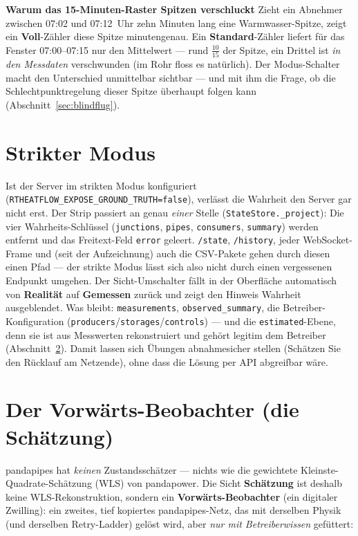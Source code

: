 \documentclass[11pt,a4paper,parskip=half]{scrreprt}
\newcommand{\ui}[1]{\textsf{\bfseries #1}}
\newcommand{\api}[1]{\texttt{#1}}
\newenvironment{beispiel}[1][Beispiel]
  {\par\medskip{\color{bsp}\hrule height 0.8pt}\nopagebreak\smallskip
   \noindent\textbf{\textsf{\textcolor{bsp}{#1}}}\quad\ignorespaces}
  {\par\nopagebreak\smallskip{\color{bsp}\hrule height 0.8pt}\par\medskip}
\begin{document}
\begin{beispiel}[Warum das 15-Minuten-Raster Spitzen verschluckt]
Zieht ein Abnehmer zwischen 07:02 und 07:12~Uhr zehn Minuten lang eine
Warmwasser-Spitze, zeigt ein \ui{Voll}-Zähler diese Spitze minutengenau. Ein
\ui{Standard}-Zähler liefert für das Fenster 07:00--07:15 nur den Mittelwert
--- rund $\tfrac{10}{15}$ der Spitze, ein Drittel ist \emph{in den Messdaten}
verschwunden (im Rohr floss es natürlich). Der Modus-Schalter macht den
Unterschied unmittelbar sichtbar --- und mit ihm die Frage, ob die
Schlechtpunktregelung dieser Spitze überhaupt folgen kann
(Abschnitt~\ref{sec:blindflug}).
\end{beispiel}

\section{Strikter Modus}
\label{sec:strikt}

Ist der Server im strikten Modus konfiguriert
(\api{RTHEATFLOW\_EXPOSE\_GROUND\_TRUTH=false}), verlässt die Wahrheit den
Server gar nicht erst. Der Strip passiert an genau \emph{einer} Stelle
(\texttt{StateStore.\_project}): Die vier Wahrheits-Schlüssel
(\texttt{junctions}, \texttt{pipes}, \texttt{consumers}, \texttt{summary})
werden entfernt und das Freitext-Feld \texttt{error} geleert. \api{/state},
\api{/history}, jeder WebSocket-Frame und (seit der Aufzeichnung) auch die
CSV-Pakete gehen durch diesen einen Pfad --- der strikte Modus lässt sich also
nicht durch einen vergessenen Endpunkt umgehen. Der Sicht-Umschalter fällt in
der Oberfläche automatisch von \ui{Realität} auf \ui{Gemessen} zurück und zeigt
den Hinweis \glqq Wahrheit ausgeblendet\grqq. Was bleibt: \texttt{measurements},
\texttt{observed\_summary}, die Betreiber-Konfiguration
(\texttt{producers}/\texttt{storages}/\texttt{controls}) --- und die
\texttt{estimated}-Ebene, denn sie ist aus Messwerten rekonstruiert und
gehört legitim dem Betreiber (Abschnitt~\ref{sec:schaetzung}). Damit lassen sich
Übungen abnahmesicher stellen (\glqq Schätzen Sie den Rücklauf am Netzende\grqq),
ohne dass die Lösung per API abgreifbar wäre.

\section{Der Vorwärts-Beobachter (die Schätzung)}
\label{sec:schaetzung}

pandapipes hat \emph{keinen} Zustandsschätzer --- nichts wie die
gewichtete Kleinste-Quadrate-Schätzung (WLS) von pandapower. Die Sicht
\ui{Schätzung} ist deshalb keine WLS-Rekonstruktion, sondern ein
\textbf{Vorwärts-Beobachter} (ein \glqq digitaler Zwilling\grqq): ein zweites,
tief kopiertes pandapipes-Netz, das mit derselben Physik (und derselben
Retry-Ladder) gelöst wird, aber \emph{nur mit Betreiberwissen} gefüttert:
\end{document}
